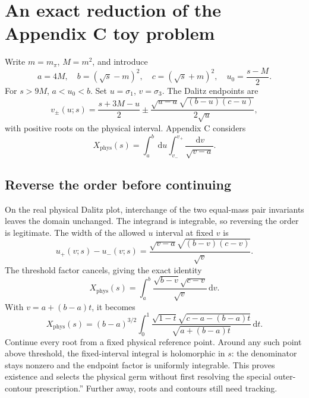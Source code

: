 \documentclass[11pt,a4paper]{article}
\newcommand{\dd}{\,\mathrm d}
\newcommand{\phys}{\mathrm{phys}}
\begin{document}
\section{An exact reduction of the Appendix C toy problem}
Write $m=m_\pi$, $M=m^2$, and introduce
\begin{equation}
 a=4M,\quad b=(\sqrt{s}-m)^2,\quad c=(\sqrt{s}+m)^2,
 \quad u_0=\frac{s-M}{2}.
\end{equation}
For $s>9M$, $a<u_0<b$. Set $u=\sigma_1$, $v=\sigma_3$. The Dalitz endpoints are
\begin{equation}
 v_\pm(u;s)=\frac{s+3M-u}{2}
 \pm\frac{\sqrt{u-a}\sqrt{(b-u)(c-u)}}{2\sqrt u},
 \label{eq:endpoints}
\end{equation}
with positive roots on the physical interval. Appendix C considers
\begin{equation}
 X_{\phys}(s)=\int_a^b\dd u\int_{v_-}^{v_+}\frac{\dd v}{\sqrt{v-a}}.
 \label{eq:toy}
\end{equation}

\subsection{Reverse the order before continuing}
On the real physical Dalitz plot, interchange of the two equal-mass pair invariants leaves the domain unchanged. The integrand is integrable, so reversing the order is legitimate. The width of the allowed $u$ interval at fixed $v$ is
\begin{equation}
 u_+(v;s)-u_-(v;s)=\frac{\sqrt{v-a}\sqrt{(b-v)(c-v)}}{\sqrt v}.
\end{equation}
The threshold factor cancels, giving the exact identity
\begin{equation}
 \boxed{X_{\phys}(s)=\int_a^b\frac{\sqrt{b-v}\sqrt{c-v}}{\sqrt v}\dd v.}
 \label{eq:reverse}
\end{equation}
With $v=a+(b-a)t$, it becomes
\begin{equation}
 X_{\phys}(s)=(b-a)^{3/2}\int_0^1
 \frac{\sqrt{1-t}\sqrt{c-a-(b-a)t}}{\sqrt{a+(b-a)t}}\dd t.
 \label{eq:fixed}
\end{equation}
Continue every root from a fixed physical reference point. Around any such point above threshold, the fixed-interval integral is holomorphic in $s$: the denominator stays nonzero and the endpoint factor is uniformly integrable. This proves existence and selects the physical germ without first resolving the special outer-contour prescription.'' Further away, roots and contours still need tracking.
\end{document}
